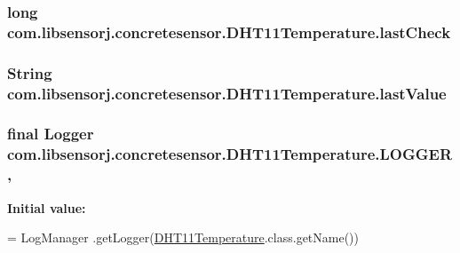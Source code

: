 \subsubsection[{last\+Check}]{\setlength{\rightskip}{0pt plus 5cm}long com.\+libsensorj.\+concretesensor.\+D\+H\+T11\+Temperature.\+last\+Check\hspace{0.3cm}{\ttfamily [private]}}\label{classcom_1_1libsensorj_1_1concretesensor_1_1DHT11Temperature_a00ec2e3e31bcaf04f497d5c503a84c5e}
\hypertarget{classcom_1_1libsensorj_1_1concretesensor_1_1DHT11Temperature_af16dd6a4c88dedacb8a4d69d90eff670}{}
\subsubsection[{last\+Value}]{\setlength{\rightskip}{0pt plus 5cm}String com.\+libsensorj.\+concretesensor.\+D\+H\+T11\+Temperature.\+last\+Value\hspace{0.3cm}{\ttfamily [private]}}\label{classcom_1_1libsensorj_1_1concretesensor_1_1DHT11Temperature_af16dd6a4c88dedacb8a4d69d90eff670}
\hypertarget{classcom_1_1libsensorj_1_1concretesensor_1_1DHT11Temperature_a96d485fc09496c1b5a320a30bb3400c9}{}
\subsubsection[{L\+O\+G\+G\+E\+R}]{\setlength{\rightskip}{0pt plus 5cm}final Logger com.\+libsensorj.\+concretesensor.\+D\+H\+T11\+Temperature.\+L\+O\+G\+G\+E\+R\hspace{0.3cm}{\ttfamily [static]}, {\ttfamily [private]}}\label{classcom_1_1libsensorj_1_1concretesensor_1_1DHT11Temperature_a96d485fc09496c1b5a320a30bb3400c9}
{\bfseries Initial value\+:}
\begin{DoxyCode}
= LogManager
            .getLogger(\hyperlink{classcom_1_1libsensorj_1_1concretesensor_1_1DHT11Temperature_a02bbdf30c922adcbde84597bf698ff41}{DHT11Temperature}.class.getName())
\end{DoxyCode}
\hypertarget{classcom_1_1libsensorj_1_1concretesensor_1_1DHT11Temperature_a123ae6845e0cc1d1ec859cf7cfb78004}{}
